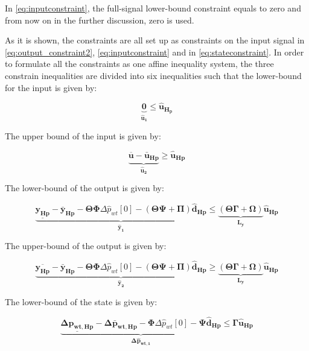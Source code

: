 In \eqref{eq:inputconstraint}, the full-signal lower-bound constraint equals to zero and from now on in the further discussion, zero is used.

As it is shown, the constraints are all set up as constraints on the input signal in \eqref{eq:output_constraint2}, \eqref{eq:inputconstraint} and in \eqref{eq:stateconstraint}. In order to formulate all the constraints as one affine inequality system, the three constrain inequalities are divided into six inequalities such that the lower-bound for the input is given by:


\begin{equation}
\underbrace{\bm{0}}_{\bm{\hat{u}_{1}}} \leq \bm{\hat{u}_{H_p}}
\end{equation}


The upper bound of the input is given by:

\begin{equation}
	\underbrace{\overline{\bm{{u}}} - \bm{\bar{u}_{Hp}}}_{\bm{\hat{u}_{2}}} \geq \bm{\hat{u}_{Hp}}
\end{equation}

The lower-bound of the output is given by:

\begin{equation}
\underbrace{\underline{\bm{y_{Hp}}} - \bm{\bar{y}_{Hp}} - \bm{\Theta} \bm{\Phi} \Delta \hat{p}_{wt}[0] - (\bm{\Theta \Psi + \Pi}) \bm{\hat{d}_{Hp}}}_{\bm{\hat{y}_1}} \leq \underbrace{(\bm{\Theta \Gamma + \Omega})}_{\bm{L_y}} \bm{\hat{u}_{Hp}}
\end{equation}

The upper-bound of the output is given by:

\begin{equation}
\underbrace{\overline{\bm{y_{Hp}}} - \bm{\bar{y}_{Hp}} - \bm{\Theta} \bm{\Phi} \Delta \hat{p}_{wt}[0] - (\bm{\Theta \Psi + \Pi}) \bm{\hat{d}_{Hp}}}_{\bm{\hat{y}_2}} \geq \underbrace{(\bm{\Theta \Gamma + \Omega})}_{\bm{L_y}} \bm{\hat{u}_{Hp}}
\end{equation}

The lower-bound of the state is given by:

\begin{equation}
\underbrace{\underline{\bm{\Delta p_{wt,Hp}}} - \bm{\Delta \bar{p}_{wt,Hp}} -  \bm{\Phi} \Delta \hat{p}_{wt}[0] - \bm{\Psi} \bm{\hat{d}_{Hp}}}_{\bm{\Delta \hat{p}_{wt,1}}} \leq \bm{\Gamma} \bm{\hat{u}_{Hp}}
\end{equation}

